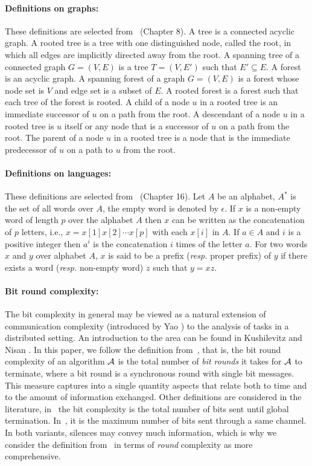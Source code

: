 \documentclass[11pt,envcountsame,letterpaper]{llncs}
\begin{document}
\paragraph{Definitions on graphs:}  These definitions are selected from~\cite{Rosenpress} (Chapter 8). A tree is a connected acyclic graph. A rooted tree is a tree with one
 distinguished node, called the root, in which all edges are implicitly 
directed away from the root. 
A spanning tree of a connected graph $G=(V,E)$ is a tree $T=(V,E')$ such that
$E'\subseteq E$.
A forest is an acyclic graph. A spanning forest of a graph $G=(V,E)$ 
is a forest whose node set is $V$ and edge set is a subset of $E$.
A rooted forest is a forest such that each tree of the forest is rooted.
A child of a node $u$ in a rooted tree is an immediate
successor of $u$ on a path from the root.
A descendant of a node $u$ in a rooted tree is $u$ itself or any node that
is a successor of $u$ on a path from the root.
The parent of a node $u$  in a rooted tree is a node that is the immediate
predecessor of $u$ on a path to $u$ from the root.

\paragraph{Definitions on languages:} These definitions are selected from~\cite{Rosenpress} (Chapter 16).
Let $A$ be an alphabet, $A^*$ is
 the set of all words over $A$, the empty word is denoted by $\epsilon$.
If $x$ is a
non-empty
word of length $p$ over the alphabet $A$ then
$x$ can be written as the concatenation of $p$ letters, i.e.,
$x=x[1]x[2]\cdots x[p]$ with each $x[i]$ in $A$.
If $a\in A$ and $i$ is a positive integer then $a^i$ is the 
 concatenation  $i$ times of  the letter $a$.
For two words $x$ and $y$ over alphabet $A$, $x$
is said to be a prefix ({\it resp.} proper prefix) of $y$ if there exists a word ({\it resp.} non-empty word) $z$
such that $y=xz$.

\paragraph{Bit round complexity:}
The bit complexity in general may be viewed as a natural
extension of communication complexity (introduced by Yao \cite{Yao})
to the analysis of tasks in a distributed setting. An introduction to the area can be found in Kushilevitz and Nisan \cite{KN}. 
In this paper, we follow the definition from~\cite{KOSS}, that is, the bit round complexity of an algorithm $\cal A$ is the total number of {\it bit rounds} it takes for $\cal A$ to terminate, where a bit round is a synchronous round with single bit messages. 
This measure captures into a single quantity aspects that relate both to time and to the amount of information exchanged. Other definitions are considered in the literature, in~\cite{BNNN90,BMW,BT90,DMR08} the bit complexity is the total number of bits sent until global termination. In~\cite{sw11}, it is the maximum number of bits sent through a same channel.
In both variants, silences may convey
much information, which is why we consider the definition from~\cite{KOSS} in terms of {\em round} complexity as more comprehensive.
\end{document}
